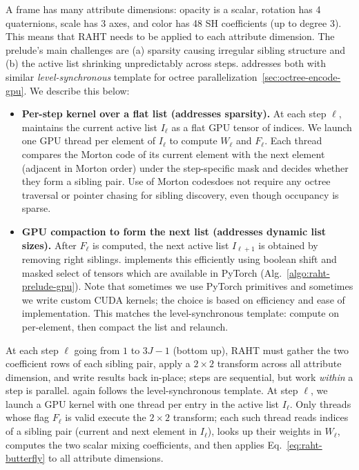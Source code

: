 A \gs frame has many attribute dimensions: opacity is a scalar, rotation has 4 quaternions, scale has 3 axes, and color has 48 SH coefficients (up to degree 3).
%
This means that RAHT needs to be applied to each attribute dimension.
The prelude’s main challenges are (a) sparsity causing irregular sibling structure and (b) the active list shrinking unpredictably across steps.
%
\gsnfs addresses both with similar \emph{level-synchronous} template for octree parallelization~\cref{sec:octree-encode-gpu}. 
%
We describe this below:

\begin{itemize}
\item \textbf{Per-step kernel over a flat list (addresses sparsity).}
%
At each step $\ell$, \gsnfs maintains the current active list $I_\ell$ as a flat GPU tensor of indices.
%
We launch one GPU thread per element of $I_\ell$ to compute $W_\ell$ and $F_\ell$.
%
Each thread compares the Morton code of its current element with the next element (adjacent in Morton order) under the step-specific mask and decides whether they form a sibling pair.
%
Use of Morton codesdoes not require any octree traversal or pointer chasing for sibling discovery, even though occupancy is sparse.

\item \textbf{GPU compaction to form the next list (addresses dynamic list sizes).}
After $F_\ell$ is computed, the next active list $I_{\ell+1}$ is obtained by removing right siblings.
%
\gsnfs implements this efficiently using boolean shift and masked select of tensors which are available in PyTorch (Alg.~\ref{algo:raht-prelude-gpu}).
%
Note that sometimes we use PyTorch primitives and sometimes we write custom CUDA kernels; the choice is based on efficiency and ease of implementation.
%
This matches the level-synchronous template: compute on per-element, then compact the list and relaunch.
\end{itemize}

At each step $\ell$ going from $1$ to $3J-1$ (bottom up), RAHT must gather the two coefficient rows of each sibling pair, apply a $2\times2$ transform across all attribute dimension, and write results back in-place; steps are sequential, but work \emph{within} a step is parallel.
%
\gsnfs again follows the level-synchronous template.
%
At step $\ell$, we launch a GPU kernel with one thread per entry in the active list $I_\ell$.
%
Only threads whose flag $F_\ell$ is valid execute the $2\times2$ transform; each such thread reads indices of a sibling pair (current and next element in $I_\ell$), looks up their weights in $W_\ell$, computes the two scalar mixing coefficients, and then applies Eq.~\ref{eq:raht-butterfly} to all attribute dimensions.

